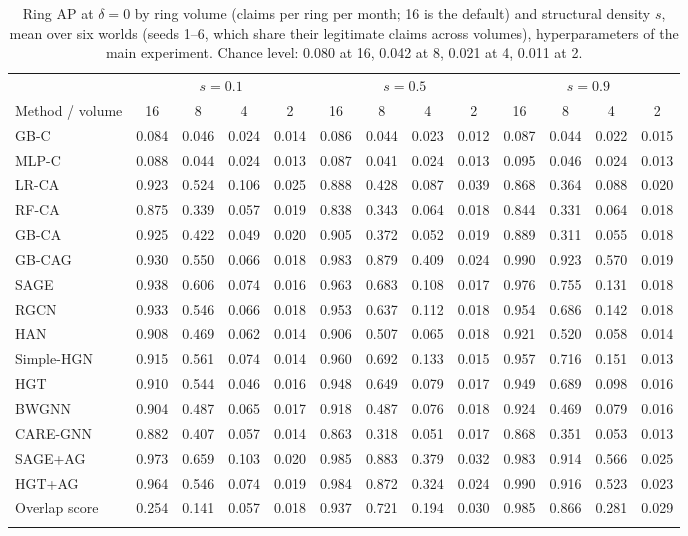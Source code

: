 \begin{table}[h]
\caption{Ring AP at $\delta=0$ by ring volume (claims per ring per month; 16 is the default) and structural density $s$, mean over six worlds (seeds 1--6, which share their legitimate claims across volumes), hyperparameters of the main experiment. Chance level: 0.080 at 16, 0.042 at 8, 0.021 at 4, 0.011 at 2.}\label{tab:dose}
\scriptsize
\setlength{\tabcolsep}{2pt}
\begin{tabular}{@{}lcccccccccccc@{}}
\toprule
 & \multicolumn{4}{c}{$s=0.1$} & \multicolumn{4}{c}{$s=0.5$} & \multicolumn{4}{c}{$s=0.9$} \\
\cmidrule(lr){2-5}\cmidrule(lr){6-9}\cmidrule(lr){10-13}
Method / volume & 16 & 8 & 4 & 2 & 16 & 8 & 4 & 2 & 16 & 8 & 4 & 2 \\
\midrule
GB-C & 0.084 & 0.046 & 0.024 & 0.014 & 0.086 & 0.044 & 0.023 & 0.012 & 0.087 & 0.044 & 0.022 & 0.015 \\
MLP-C & 0.088 & 0.044 & 0.024 & 0.013 & 0.087 & 0.041 & 0.024 & 0.013 & 0.095 & 0.046 & 0.024 & 0.013 \\
LR-CA & 0.923 & 0.524 & 0.106 & 0.025 & 0.888 & 0.428 & 0.087 & 0.039 & 0.868 & 0.364 & 0.088 & 0.020 \\
RF-CA & 0.875 & 0.339 & 0.057 & 0.019 & 0.838 & 0.343 & 0.064 & 0.018 & 0.844 & 0.331 & 0.064 & 0.018 \\
GB-CA & 0.925 & 0.422 & 0.049 & 0.020 & 0.905 & 0.372 & 0.052 & 0.019 & 0.889 & 0.311 & 0.055 & 0.018 \\
GB-CAG & 0.930 & 0.550 & 0.066 & 0.018 & 0.983 & 0.879 & 0.409 & 0.024 & 0.990 & 0.923 & 0.570 & 0.019 \\
\midrule
SAGE & 0.938 & 0.606 & 0.074 & 0.016 & 0.963 & 0.683 & 0.108 & 0.017 & 0.976 & 0.755 & 0.131 & 0.018 \\
RGCN & 0.933 & 0.546 & 0.066 & 0.018 & 0.953 & 0.637 & 0.112 & 0.018 & 0.954 & 0.686 & 0.142 & 0.018 \\
HAN & 0.908 & 0.469 & 0.062 & 0.014 & 0.906 & 0.507 & 0.065 & 0.018 & 0.921 & 0.520 & 0.058 & 0.014 \\
Simple-HGN & 0.915 & 0.561 & 0.074 & 0.014 & 0.960 & 0.692 & 0.133 & 0.015 & 0.957 & 0.716 & 0.151 & 0.013 \\
HGT & 0.910 & 0.544 & 0.046 & 0.016 & 0.948 & 0.649 & 0.079 & 0.017 & 0.949 & 0.689 & 0.098 & 0.016 \\
\midrule
BWGNN & 0.904 & 0.487 & 0.065 & 0.017 & 0.918 & 0.487 & 0.076 & 0.018 & 0.924 & 0.469 & 0.079 & 0.016 \\
CARE-GNN & 0.882 & 0.407 & 0.057 & 0.014 & 0.863 & 0.318 & 0.051 & 0.017 & 0.868 & 0.351 & 0.053 & 0.013 \\
\midrule
SAGE+AG & 0.973 & 0.659 & 0.103 & 0.020 & 0.985 & 0.883 & 0.379 & 0.032 & 0.983 & 0.914 & 0.566 & 0.025 \\
HGT+AG & 0.964 & 0.546 & 0.074 & 0.019 & 0.984 & 0.872 & 0.324 & 0.024 & 0.990 & 0.916 & 0.523 & 0.023 \\
Overlap score & 0.254 & 0.141 & 0.057 & 0.018 & 0.937 & 0.721 & 0.194 & 0.030 & 0.985 & 0.866 & 0.281 & 0.029 \\
\botrule
\end{tabular}
\end{table}